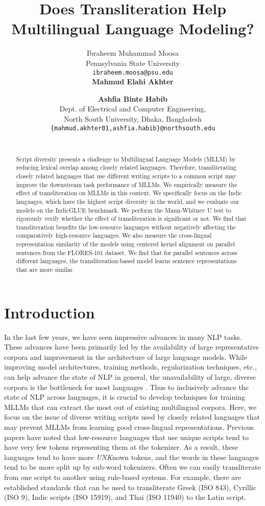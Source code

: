 \documentclass[11pt]{article}
\title{Does Transliteration Help Multilingual Language Modeling?}
\author{Ibraheem Muhammad Moosa \\
  Pennsylvania State University \\
  \texttt{ibraheem.moosa@psu.edu} \\\AND
   {\bf Mahmud Elahi Akhter} \and {\bf Ashfia Binte Habib}\\
  Dept. of Electrical and Computer Engineering, \\
  North South University, Dhaka, Bangladesh\\
  \texttt{\{mahmud.akhter01,ashfia.habib\}@northsouth.edu} \\\\}
\begin{document}
\maketitle
\begin{abstract}
Script diversity presents a challenge to Multilingual Language Models (MLLM) by reducing lexical overlap among closely related languages. Therefore, transliterating closely related languages that use different writing scripts to a common script may improve the downstream task performance of MLLMs. 
We empirically measure the effect of transliteration on MLLMs in this context. 
We specifically focus on the Indic languages, which have the highest script diversity in the world, and we evaluate our models on the IndicGLUE benchmark. We perform the Mann-Whitney U test to rigorously verify whether the effect of transliteration is significant or not. We find that transliteration benefits the low-resource languages without negatively affecting the comparatively high-resource languages. We also measure the cross-lingual representation similarity of the models using centered kernel alignment on parallel sentences from the FLORES-101 dataset. We find that for parallel sentences across different languages, the transliteration-based model learns sentence representations that are more similar.
\end{abstract}

\section{Introduction}
\label{introduction}
In the last few years, we have seen impressive advances in many NLP tasks. These advances have been primarily led by the availability of large representative corpora and improvement in the architecture of large language models. While improving model architectures, training methods, regularization techniques, etc., can help advance the state of NLP in general, the unavailability of large, diverse corpora is the bottleneck for most languages \citep{joshi-etal-2020-state}. Thus to inclusively advance the state of NLP across languages, it is crucial to develop techniques for training MLLMs that can extract the most out of existing multilingual corpora. Here, we focus on the issue of diverse writing scripts used by closely related languages that may prevent MLLMs from learning good cross-lingual representations. Previous papers \citep{Pfeiffer2021UNKsEA} have noted that low-resource languages that use unique scripts tend to have very few tokens representing them at the tokenizer. As a result, these languages tend to have more \textit{UNK}nown tokens, and the words in these languages tend to be more split up by sub-word tokenizers. Often we can easily transliterate from one script to another using rule-based systems. For example, there are established standards that can be used to transliterate Greek (ISO 843), Cyrillic (ISO 9), Indic scripts (ISO 15919), and Thai (ISO 11940) to the Latin script. 
\end{document}
